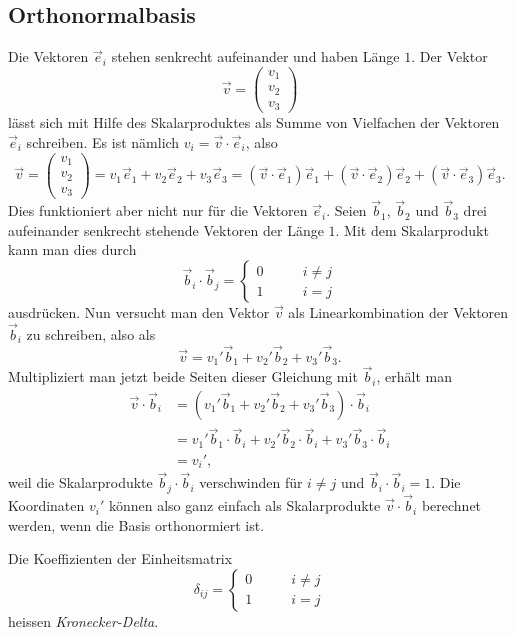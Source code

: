 \subsection{Orthonormalbasis}
Die Vektoren $\vec e_i$ stehen senkrecht aufeinander und haben
Länge $1$.
Der Vektor
\[
\vec v
=
\begin{pmatrix}v_1\\v_2\\v_3\end{pmatrix}
\]
lässt sich mit Hilfe des Skalarproduktes als Summe von Vielfachen
der Vektoren $\vec e_i$ schreiben.
Es ist nämlich $v_i=\vec v\cdot\vec e_i$, also
\[
\vec v
=
\begin{pmatrix}v_1\\v_2\\v_3\end{pmatrix}
=
v_1\vec e_1
+
v_2\vec e_2
+
v_3\vec e_3
=
(\vec v\cdot \vec e_1)\vec e_1
+
(\vec v\cdot \vec e_2)\vec e_2
+
(\vec v\cdot \vec e_3)\vec e_3.
\]
Dies funktioniert aber nicht nur für die Vektoren $\vec e_i$.
Seien $\vec b_1$, $\vec b_2$ und $\vec b_3$ drei aufeinander senkrecht
stehende Vektoren der Länge $1$.
Mit dem Skalarprodukt kann man dies durch
\[
\vec b_i\cdot\vec b_j=\begin{cases}
0&\qquad i\ne j\\
1&\qquad i=j
\end{cases}
\]
ausdrücken.
Nun versucht man den Vektor $\vec v$ als Linearkombination
der Vektoren $\vec b_i$ zu schreiben, also als
\[
\vec v
=
v_1'\vec b_1
+
v_2'\vec b_2
+
v_3'\vec b_3.
\]
Multipliziert man jetzt beide Seiten dieser Gleichung mit $\vec{b}_i$,
erhält man
\begin{align*}
\vec v\cdot \vec b_i
&=
(
v_1'\vec b_1
+
v_2'\vec b_2
+
v_3'\vec b_3
)\cdot
\vec b_i
\\
&=
v_1'\vec b_1\cdot\vec b_i
+
v_2'\vec b_2\cdot\vec b_i
+
v_3'\vec b_3\cdot\vec b_i
\\
&=v_i',
\end{align*}
weil die Skalarprodukte $\vec{b}_j\cdot\vec{b}_i$ verschwinden für $i\ne j$
und $\vec{b}_i\cdot\vec{b}_i=1$.
Die Koordinaten $v_i'$ können also ganz einfach als Skalarprodukte 
$\vec{v}\cdot\vec{b}_i$ berechnet werden, wenn die Basis orthonormiert ist.

\begin{definition} Die Koeffizienten der Einheitsmatrix
\[
\delta_{ij}=
\begin{cases}
0&\qquad i\ne j\\
1&\qquad i=j
\end{cases}
\]
heissen {\em Kronecker-Delta}.
\end{definition}

